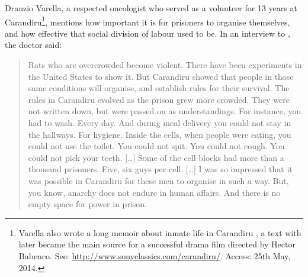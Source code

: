 
Drauzio Varella, a respected oncologist who served as a volunteer for 13 years at Carandiru\footnote{Varella also wrote a long memoir about inmate life in Carandiru \citep[]{varella1999estaccao}, a text with later became the main source for a successful drama film directed by Hector Babenco. See: \href{http://www.sonyclassics.com/carandiru/}{http://www.sonyclassics.com/carandiru/}. Access:  25th May, 2014.}, mentions how important it is for prisoners to organise themselves, and how effective that social division of labour used to be. In an interview to \citet[]{vanityfair2007pcc}, the doctor said:

\begin{quotation}
Rats who are overcrowded become violent. There have been experiments in the United States to show it. But Carandiru showed that people in those same conditions will organise, and establish rules for their survival. The rules in Carandiru evolved as the prison grew more crowded. They were not written down, but were passed on as understandings. For instance, you had to wash. Every day. And during meal delivery you could not stay in the hallways. For hygiene. Inside the cells, when people were eating, you could not use the toilet. You could not spit. You could not cough. You could not pick your teeth. [\dots] Some of the cell blocks had more than a thousand prisoners. Five, six guys per cell. [\dots] I was so impressed that it was possible in Carandiru for these men to organise in such a way. But, you know, anarchy does not endure in human affairs. And there is no empty space for power in prison.
\end{quotation}

